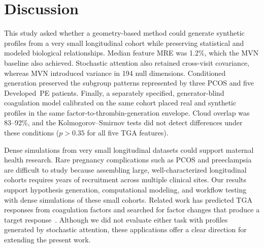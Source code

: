 \section{Discussion}
\label{sec:discussion}

This study asked whether a geometry-based method could generate synthetic profiles from a
very small longitudinal cohort while preserving statistical and modeled biological
relationships. Median feature MRE was 1.2\%, which the MVN baseline also achieved.
Stochastic attention also retained cross-visit covariance, whereas MVN introduced variance in
194 null dimensions. Conditioned generation preserved the subgroup patterns represented by
three PCOS and five Developed~PE patients. Finally, a separately specified,
generator-blind coagulation model calibrated on the same cohort placed real and synthetic
profiles in the same factor-to-thrombin-generation envelope. Cloud overlap was 83--92\%, and
the Kolmogorov--Smirnov tests did not detect differences under these conditions ($p>0.35$ for
all five TGA features).

Dense simulations from very small longitudinal datasets could support maternal health
research. Rare pregnancy complications such as PCOS and preeclampsia are difficult to study
because assembling large, well-characterized longitudinal cohorts requires years of
recruitment across multiple clinical sites. Our results support hypothesis generation,
computational modeling, and workflow testing with dense simulations of these small cohorts.
Related work has predicted TGA responses from coagulation factors and searched for
factor changes that produce a target response~\citep{Ghetmiri2021}. Although we did not
evaluate either task with profiles generated by stochastic attention, these applications
offer a clear direction for extending the present work.

